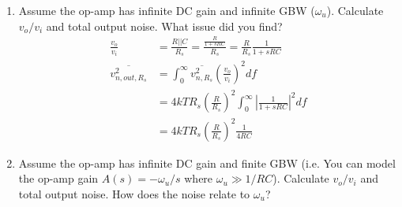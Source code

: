 \begin{enumerate}[label=(\alph*)]
  \item {\color{blue}Assume the op-amp has infinite DC gain and infinite GBW ($\omega_u$). Calculate $v_o / v_i$ and total output noise. What issue did you find?}
    \begin{align*}
      \frac{v_o}{v_i} &= \frac{R || C}{R_s} = \frac{\frac{R}{1 + sRC}}{R_s} = \frac{R}{R_s} \frac{1}{1 + sRC} \\
      \overline{v_{n,out,R_s}^2} &= \int_{0}^{\infty} \overline{v_{n,R_s}^2} \left(\frac{v_o}{v_i}\right)^2 df \\
        &= 4kT R_s \left(\frac{R}{R_s}\right)^2 \int_0^{\infty} \left|\frac{1}{1 + sRC}\right|^2 df \\
        &= 4kT R_s \left(\frac{R}{R_s}\right)^2 \frac{1}{4RC}
    \end{align*}
  \item {\color{blue}Assume the op-amp has infinite DC gain and finite GBW (i.e. You can model the op-amp gain $A(s) = -\omega_u/s$ where $\omega_u \gg 1 / RC$). Calculate $v_o/v_i$ and total output noise. How does the noise relate to $\omega_u$?}
\end{enumerate}


